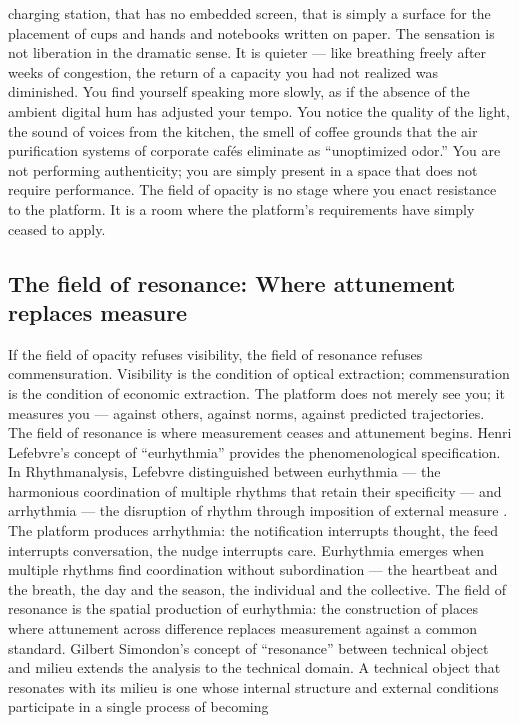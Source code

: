 charging station, that has no embedded screen, that is simply a surface for the placement of cups and hands and notebooks written on paper. The sensation is not liberation in the dramatic sense. It is quieter — like breathing freely after weeks of congestion, the return of a capacity you had not realized was diminished. You find yourself speaking more slowly, as if the absence of the ambient digital hum has adjusted your tempo. You notice the quality of the light, the sound of voices from the kitchen, the smell of coffee grounds that the air purification systems of corporate cafés eliminate as “unoptimized odor.” You are not performing authenticity; you are simply present in a space that does not require performance. The field of opacity is no stage where you enact resistance to the platform. It is a room where the platform’s requirements have simply ceased to apply.

\subsection{The field of resonance: Where attunement replaces measure}

If the field of opacity refuses visibility, the field of resonance refuses commensuration. Visibility is the condition of optical extraction; commensuration is the condition of economic extraction. The platform does not merely see you; it measures you — against others, against norms, against predicted trajectories. The field of resonance is where measurement ceases and attunement begins. Henri Lefebvre’s concept of “eurhythmia” provides the phenomenological specification. In Rhythmanalysis, Lefebvre distinguished between eurhythmia — the harmonious coordination of multiple rhythms that retain their specificity — and arrhythmia — the disruption of rhythm through imposition of external measure \cite[pp.~15--28]{lefebvre_2004}. The platform produces arrhythmia: the notification interrupts thought, the feed interrupts conversation, the nudge interrupts care. Eurhythmia emerges when multiple rhythms find coordination without subordination — the heartbeat and the breath, the day and the season, the individual and the collective. The field of resonance is the spatial production of eurhythmia: the construction of places where attunement across difference replaces measurement against a common standard. Gilbert Simondon’s concept of “resonance” between technical object and milieu extends the analysis to the technical domain. A technical object that resonates with its milieu is one whose internal structure and external conditions participate in a single process of becoming

